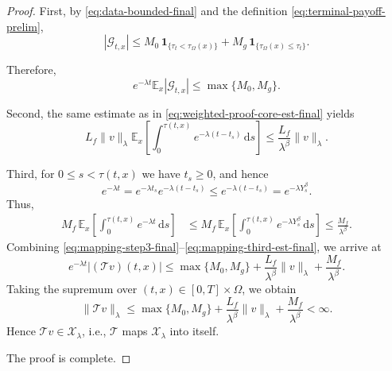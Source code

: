 \documentclass[10pt,a4paper]{amsart}
\begin{document}
\begin{proof}
First, by \eqref{eq:data-bounded-final} and the definition \eqref{eq:terminal-payoff-prelim},
\[
|\mathcal{G}_{t,x}|
\le
M_0\,\mathbf{1}_{\{\tau_t<\tau_\Omega(x)\}}
+
M_g\,\mathbf{1}_{\{\tau_\Omega(x)\le \tau_t\}}.
\]

Therefore,
\begin{equation}\label{eq:terminal-est-final}
e^{-\lambda t}\mathbb{E}_x|\mathcal{G}_{t,x}|
\le
\max\{M_0,M_g\}.
\end{equation}

Second, the same estimate as in \eqref{eq:weighted-proof-core-est-final} yields
\begin{equation}\label{eq:mapping-second-est-final}
L_f\|v\|_\lambda
\mathbb{E}_x\!\left[
\int_0^{\tau(t,x)}
e^{-\lambda(t-t_s)}\,\mathrm{d}s
\right]
\le
\frac{L_f}{\lambda^\beta}\|v\|_\lambda.
\end{equation}

Third, for $0\le s<\tau(t,x)$ we have $t_s\ge 0$, and hence
\[
e^{-\lambda t}
=
e^{-\lambda t_s}e^{-\lambda(t-t_s)}
\le
e^{-\lambda(t-t_s)}
=
e^{-\lambda Y_s^\beta}.
\]
Thus,
\begin{align}
M_f\,
\mathbb{E}_x\!\left[
\int_0^{\tau(t,x)} e^{-\lambda t}\,\mathrm{d}s
\right]
&\le
M_f\,
\mathbb{E}_x\!\left[
\int_0^{\tau(t,x)} e^{-\lambda Y_s^\beta}\,\mathrm{d}s
\right]
\le
\frac{M_f}{\lambda^\beta}.
\label{eq:mapping-third-est-final}
\end{align}
Combining \eqref{eq:mapping-step3-final}--\eqref{eq:mapping-third-est-final}, we arrive at
\[
e^{-\lambda t}|(\mathcal{T}v)(t,x)|
\le
\max\{M_0,M_g\}
+
\frac{L_f}{\lambda^\beta}\|v\|_\lambda
+
\frac{M_f}{\lambda^\beta}.
\]
Taking the supremum over $(t,x)\in[0,T]\times\Omega$, we obtain
\begin{equation}\label{eq:mapping-bound-final}
\|\mathcal{T}v\|_\lambda
\le
\max\{M_0,M_g\}
+
\frac{L_f}{\lambda^\beta}\|v\|_\lambda
+
\frac{M_f}{\lambda^\beta}
<\infty.
\end{equation}
Hence $\mathcal{T}v\in\mathcal{X}_\lambda$, i.e., $\mathcal{T}$ maps $\mathcal{X}_\lambda$ into itself.

The proof is complete.
\end{proof}
\end{document}
